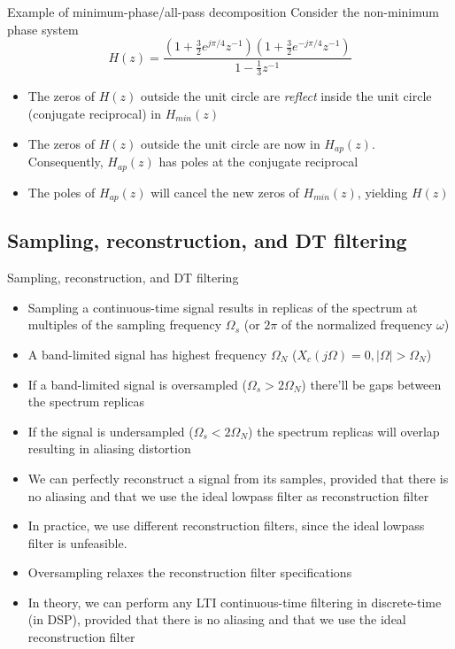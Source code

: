 \documentclass[10pt, aspectratio=169]{beamer}
\begin{document}
\begin{frame}{Example of minimum-phase/all-pass decomposition}
Consider the non-minimum phase system
\begin{equation*}
H(z) = \frac{(1 + \frac{3}{2}e^{j\pi/4}z^{-1})(1 + \frac{3}{2}e^{-j\pi/4}z^{-1})}{1 - \frac{1}{3}z^{-1}}
\end{equation*}

\begin{center}
	\resizebox{0.75\paperwidth}{!}{}
\end{center}

\begin{itemize}
\item The zeros of $H(z)$ outside the unit circle are \textit{reflect} inside the unit circle (conjugate reciprocal) in $H_{min}(z)$
\item The zeros of $H(z)$ outside the unit circle are now in $H_{ap}(z)$. Consequently, $H_{ap}(z)$ has poles at the conjugate reciprocal
\item The poles of $H_{ap}(z)$ will cancel the new zeros of $H_{min}(z)$, yielding $H(z)$
\end{itemize}
\end{frame}

%
\subsection{Sampling, reconstruction, and DT filtering}
\begin{frame}{Sampling, reconstruction, and DT filtering}
\begin{itemize}
	\item Sampling a continuous-time signal results in replicas of the spectrum at multiples of the sampling frequency $\Omega_s$ (or $2\pi$ of the normalized frequency $\omega$)
	\item A band-limited signal has highest frequency $\Omega_N$ ($X_c(j\Omega) = 0, |\Omega| > \Omega_N$)
	\item If a band-limited signal is oversampled ($\Omega_s > 2\Omega_N$) there'll be gaps between the spectrum replicas
	\item If the signal is undersampled ($\Omega_s < 2\Omega_N$) the spectrum replicas will overlap resulting in aliasing distortion
	\item We can perfectly reconstruct a signal from its samples, provided that there is no aliasing and that we use the ideal lowpass filter as reconstruction filter
	\item In practice, we use different reconstruction filters, since the ideal lowpass filter is unfeasible.
	\item Oversampling relaxes the reconstruction filter specifications
	\item In theory, we can perform any LTI continuous-time filtering in discrete-time (in DSP), provided that there is no aliasing and that we use the ideal reconstruction filter
\end{itemize}
\end{frame}
\end{document}
